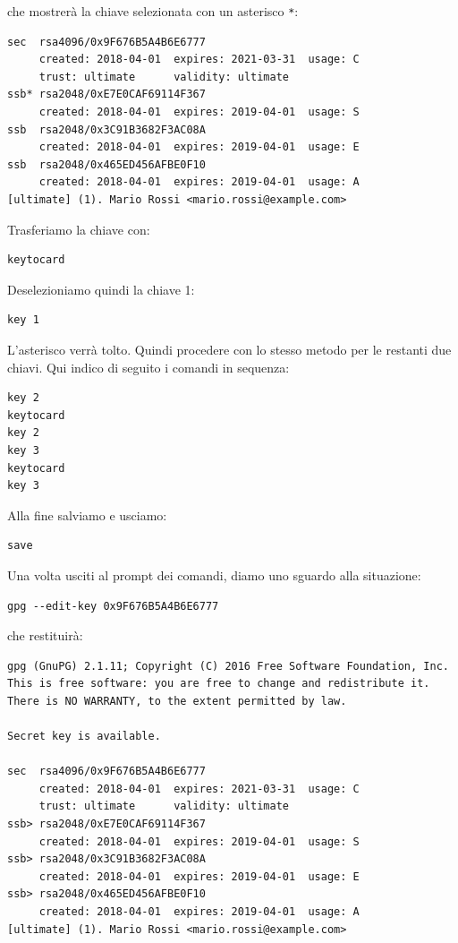 \documentclass[a4paper,10pt]{article}
\begin{document}
che mostrerà la chiave selezionata con un asterisco \texttt{*}:

\begin{lstlisting}
sec  rsa4096/0x9F676B5A4B6E6777
     created: 2018-04-01  expires: 2021-03-31  usage: C
     trust: ultimate      validity: ultimate
ssb* rsa2048/0xE7E0CAF69114F367
     created: 2018-04-01  expires: 2019-04-01  usage: S
ssb  rsa2048/0x3C91B3682F3AC08A
     created: 2018-04-01  expires: 2019-04-01  usage: E
ssb  rsa2048/0x465ED456AFBE0F10
     created: 2018-04-01  expires: 2019-04-01  usage: A
[ultimate] (1). Mario Rossi <mario.rossi@example.com>
\end{lstlisting}

Trasferiamo la chiave con:

\begin{lstlisting}
keytocard
\end{lstlisting}

Deselezioniamo quindi la chiave 1:

\begin{lstlisting}
key 1
\end{lstlisting}

L'asterisco verrà tolto. Quindi procedere con lo stesso metodo per le restanti due chiavi. Qui indico di seguito i comandi in sequenza:

\begin{lstlisting}
key 2
keytocard
key 2
key 3
keytocard
key 3
\end{lstlisting}

Alla fine salviamo e usciamo:

\begin{lstlisting}
save
\end{lstlisting}

Una volta usciti al prompt dei comandi, diamo uno sguardo alla situazione:

\begin{lstlisting}
gpg --edit-key 0x9F676B5A4B6E6777
\end{lstlisting}

che restituirà:

\begin{lstlisting}
gpg (GnuPG) 2.1.11; Copyright (C) 2016 Free Software Foundation, Inc.
This is free software: you are free to change and redistribute it.
There is NO WARRANTY, to the extent permitted by law.

Secret key is available.

sec  rsa4096/0x9F676B5A4B6E6777
     created: 2018-04-01  expires: 2021-03-31  usage: C
     trust: ultimate      validity: ultimate
ssb> rsa2048/0xE7E0CAF69114F367
     created: 2018-04-01  expires: 2019-04-01  usage: S
ssb> rsa2048/0x3C91B3682F3AC08A
     created: 2018-04-01  expires: 2019-04-01  usage: E
ssb> rsa2048/0x465ED456AFBE0F10
     created: 2018-04-01  expires: 2019-04-01  usage: A
[ultimate] (1). Mario Rossi <mario.rossi@example.com>
\end{lstlisting}
\end{document}
